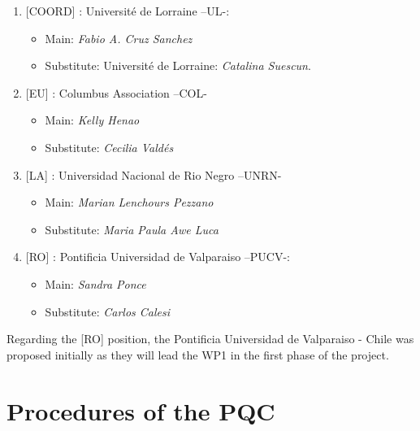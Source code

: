 \documentclass[
  12pt,
  oneside]{book}
\providecommand{\tightlist}{%
  \setlength{\itemsep}{0pt}\setlength{\parskip}{0pt}}\usepackage{longtable,booktabs,array}
\begin{document}
\begin{enumerate}
\def\labelenumi{\arabic{enumi}.}
\tightlist
\item
  {[}COORD{]} : Université de Lorraine --UL-:

  \begin{itemize}
  \tightlist
  \item
    Main: \emph{Fabio A. Cruz Sanchez}
  \item
    Substitute: Université de Lorraine: \emph{Catalina Suescun}.
  \end{itemize}
\item
  {[}EU{]} : Columbus Association --COL-

  \begin{itemize}
  \tightlist
  \item
    Main: \emph{Kelly Henao}
  \item
    Substitute: \emph{Cecilia Valdés}
  \end{itemize}
\item
  {[}LA{]} : Universidad Nacional de Rio Negro --UNRN-

  \begin{itemize}
  \tightlist
  \item
    Main: \emph{Marian Lenchours Pezzano}
  \item
    Substitute: \emph{Maria Paula Awe Luca}
  \end{itemize}
\item
  {[}RO{]} : Pontificia Universidad de Valparaiso --PUCV-:

  \begin{itemize}
  \tightlist
  \item
    Main: \emph{Sandra Ponce}
  \item
    Substitute: \emph{Carlos Calesi}
  \end{itemize}
\end{enumerate}

Regarding the {[}RO{]} position, the Pontificia Universidad de
Valparaiso - Chile was proposed initially as they will lead the WP1 in
the first phase of the project.

\section{Procedures of the PQC}\label{procedures-of-the-pqc}
\end{document}
